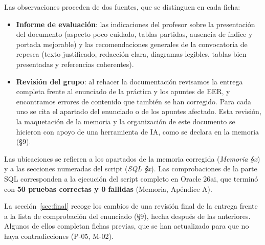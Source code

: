 \documentclass[11pt,a4paper]{article}
\DeclareRobustCommand{\_}{\textunderscore\allowbreak}
\begin{document}
Las observaciones proceden de dos fuentes, que se distinguen en cada ficha:
\begin{itemize}
\item \textbf{Informe de evaluación}: las indicaciones del profesor sobre la presentación del documento (aspecto poco cuidado, tablas partidas, ausencia de índice y portada mejorable) y las recomendaciones generales de la convocatoria de repesca (texto justificado, redacción clara, diagramas legibles, tablas bien presentadas y referencias coherentes).
\item \textbf{Revisión del grupo}: al rehacer la documentación revisamos la entrega completa frente al enunciado de la práctica y los apuntes de EER, y encontramos errores de contenido que también se han corregido. Para cada uno se cita el apartado del enunciado o de los apuntes afectado. Esta revisión, la maquetación de la memoria y la organización de este documento se hicieron con apoyo de una herramienta de IA, como se declara en la memoria (§9).
\end{itemize}

Las ubicaciones se refieren a los apartados de la memoria corregida (\emph{Memoria §x}) y a las secciones numeradas del script (\emph{SQL §x}). Las comprobaciones de la parte SQL corresponden a la ejecución del script completo en Oracle 26ai, que terminó con \textbf{50 pruebas correctas y 0 fallidas} (Memoria, Apéndice A).

La sección~\ref{sec:final} recoge los cambios de una revisión final de la entrega frente a la lista de comprobación del enunciado (§9), hecha después de las anteriores. Algunos de ellos completan fichas previas, que se han actualizado para que no haya contradicciones (P-05, M-02).

\end{document}
